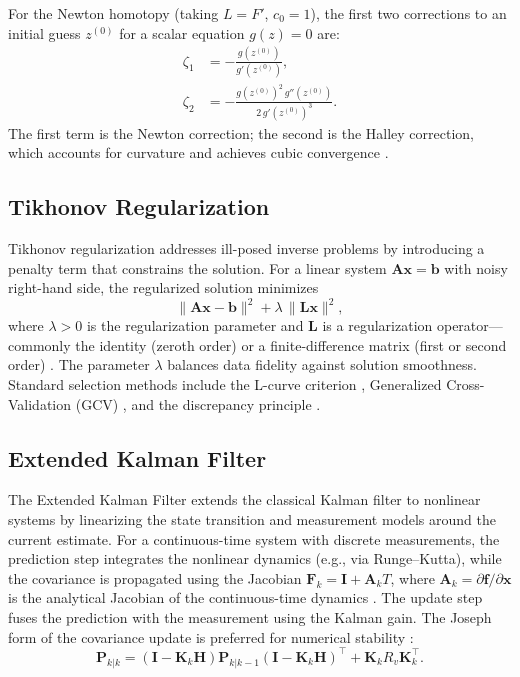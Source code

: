 \documentclass[lettersize,journal]{IEEEtran}
\begin{document}
For the Newton homotopy (taking $L = F'$, $c_0 = 1$), the first two corrections to an initial guess $z^{(0)}$ for a scalar equation $g(z) = 0$ are:
\begin{align}
\zeta_1 &= -\frac{g(z^{(0)})}{g'(z^{(0)})}, \label{eq:newton}\\
\zeta_2 &= -\frac{g(z^{(0)})^2 \, g''(z^{(0)})}{2\,g'(z^{(0)})^3}. \label{eq:halley}
\end{align}
The first term is the Newton correction; the second is the Halley correction, which accounts for curvature and achieves cubic convergence \cite{householder1970}.

\subsection{Tikhonov Regularization}

Tikhonov regularization \cite{tikhonov1977} addresses ill-posed inverse problems by introducing a penalty term that constrains the solution. For a linear system $\mathbf{A}\mathbf{x} = \mathbf{b}$ with noisy right-hand side, the regularized solution minimizes
\begin{equation}
\label{eq:tikhonov_general}
\|\mathbf{A}\mathbf{x} - \mathbf{b}\|^2 + \lambda\,\|\mathbf{L}\mathbf{x}\|^2,
\end{equation}
where $\lambda > 0$ is the regularization parameter and $\mathbf{L}$ is a regularization operator---commonly the identity (zeroth order) or a finite-difference matrix (first or second order) \cite{hansen1998}. The parameter $\lambda$ balances data fidelity against solution smoothness. Standard selection methods include the L-curve criterion \cite{hansen1992}, Generalized Cross-Validation (GCV) \cite{golub1979}, and the discrepancy principle \cite{engl1996}.

\subsection{Extended Kalman Filter}

The Extended Kalman Filter \cite{simon2006} extends the classical Kalman filter to nonlinear systems by linearizing the state transition and measurement models around the current estimate. For a continuous-time system with discrete measurements, the prediction step integrates the nonlinear dynamics (e.g., via Runge--Kutta), while the covariance is propagated using the Jacobian $\mathbf{F}_k = \mathbf{I} + \mathbf{A}_k T$, where $\mathbf{A}_k = \partial \mathbf{f}/\partial \mathbf{x}$ is the analytical Jacobian of the continuous-time dynamics \cite{wan2000}. The update step fuses the prediction with the measurement using the Kalman gain. The Joseph form of the covariance update is preferred for numerical stability \cite{simon2006}:
\begin{equation}
\label{eq:joseph}
\mathbf{P}_{k|k} = (\mathbf{I} - \mathbf{K}_k\mathbf{H})\mathbf{P}_{k|k-1}(\mathbf{I} - \mathbf{K}_k\mathbf{H})^\top + \mathbf{K}_k R_v \mathbf{K}_k^\top.
\end{equation}
\end{document}
